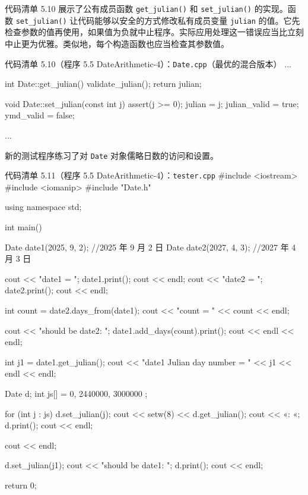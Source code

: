 代码清单 5.10 展示了公有成员函数 \texttt{get\_\allowbreak{}julian(\allowbreak{})\allowbreak{}} 和 \texttt{set\_\allowbreak{}julian(\allowbreak{})\allowbreak{}} 的实现。函数 \texttt{set\_\allowbreak{}julian(\allowbreak{})\allowbreak{}} 让代码能够以安全的方式修改私有成员变量 \texttt{julian} 的值。它先检查参数的值再使用，如果值为负就中止程序。实际应用处理这一错误应当比立刻中止更为优雅。类似地，每个构造函数也应当检查其参数值。

\begin{codeboxt}{代码清单 5.10（程序 5.5 DateArithmetic-4）：\texttt{Date.cpp}（最优的混合版本）}
...

int Date::get_julian()
{
    validate_julian();
    return julian;
}

void Date::set_julian(const int j)
{
    assert(j >= 0);
    julian = j;
    julian_valid = true;
    ymd_valid = false;
}

...
\end{codeboxt}

新的测试程序练习了对 \texttt{Date} 对象儒略日数的访问和设置。

\begin{codeboxt}{代码清单 5.11（程序 5.5 DateArithmetic-4）：\texttt{tester.\allowbreak{}cpp}}
#include <iostream>
#include <iomanip>
#include "Date.h"

using namespace std;

int main()
{
    Date date1(2025, 9, 2);  //2025 年 9 月 2 日
    Date date2(2027, 4, 3);  //2027 年 4 月 3 日

    cout << "date1 = "; date1.print(); cout << endl;
    cout << "date2 = "; date2.print(); cout << endl;

    int count = date2.days_from(date1);
    cout << "count = " << count << endl;

    cout << "should be date2: ";
    date1.add_days(count).print(); cout << endl << endl;

    int j1 = date1.get_julian();
    cout << "date1 Julian day number = " << j1 << endl << endl;

    Date d;
    int js[] = { 0, 2440000, 3000000 };

    for (int j : js)
    {
        d.set_julian(j);
        cout << setw(8) << d.get_julian();
        cout << «: «; d.print(); cout << endl;
    }

    cout << endl;

    d.set_julian(j1);
    cout << "should be date1: "; d.print(); cout << endl;

    return 0;
}
\end{codeboxt}

